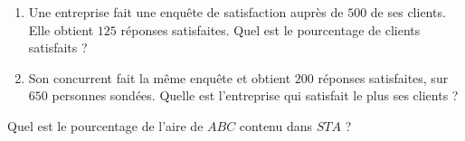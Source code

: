 
\setcounter{exorituel}{0}

\begin{rituel}
    
\begin{enumerate}
    \item
        Une entreprise fait une enquête de satisfaction auprès de \( 500\) de ses clients. Elle obtient \( 125\) réponses satisfaites. Quel est le pourcentage de clients satisfaits ?
    \item
        Son concurrent fait la même enquête et obtient \( 200\) réponses satisfaites, sur \( 650\) personnes sondées. Quelle est l'entreprise qui satisfait le plus ses clients ?
\end{enumerate}

\end{rituel}


\begin{rituel}
    
\begin{center}
    
\end{center}

Quel est le pourcentage de l'aire de \( ABC\) contenu dans \( STA\) ?

\end{rituel}
